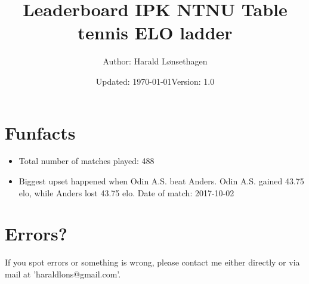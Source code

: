 \documentclass[11pt]{article}
\newcommand\tab[1][1cm]{\hspace*{#1}}
\begin{document}
\title{\textbf{Leaderboard IPK NTNU Table tennis ELO ladder }}
\author{Author: Harald Lønsethagen}
\date{Updated: \today\tab Version: 1.0}

\maketitle
 

\makeatletter


\section*{Funfacts}
\begin{itemize}
    \item Total number of matches played: 488
    \item Biggest upset happened when Odin A.S. beat Anders. Odin A.S. gained 43.75 elo, while Anders lost 43.75 elo. Date of match: 2017-10-02
\end{itemize}
\section*{Errors?}
If you spot errors or something is wrong, please contact me either directly or via mail at 'haraldlons@gmail.com'.
\end{document}
